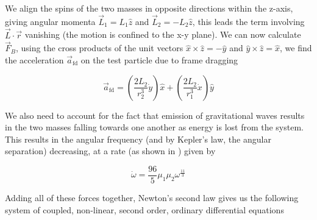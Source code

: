 \documentclass{article}
\begin{document}
We align the spins of the two masses in opposite directions within the z-axis, giving angular momenta $\vec{L}_1= L_1 \hat{z}$ and $\vec{L}_2= -L_2 \hat{z}$, this leads the term involving $\vec{L} \cdot \vec{r}$ vanishing (the motion is confined to the x-y plane). We can now 
calculate $\vec{F}_B$, using the cross products of the unit vectors $\hat{x} \times \hat{z} = -\hat{y}$ and $\hat{y} \times \hat{z} = \hat{x}$, we find the acceleration $\vec{a}_\mathrm{fd}$ on the test particle due to frame dragging

\begin{equation}
    \label{eq: Acceleration due to frame dragging}
    \vec{a}_\mathrm{fd} = \left(\frac{2 L_2}{r_2^3} \dot{y} \right) \hat{x} + \left( \frac{2 L_2}{r_1^3} \dot{x} \right) \hat{y}
\end{equation}

We also need to account for the fact that emission of gravitational waves results in the two masses falling towards one another as energy is lost from the system. This results in the angular frequency  (and by Kepler's law, the angular separation) decreasing, at a rate  (as shown in \cite{peters1964gravitational}) given by 

\begin{equation}
    \dot{\omega} = \frac{96}{5} \mu_1 \mu_2 \omega^{\frac{11}{3}}
\end{equation}

Adding all of these forces together, Newton's second law gives us the following system of coupled, non-linear, second order, ordinary differential equations





    
\end{document}
